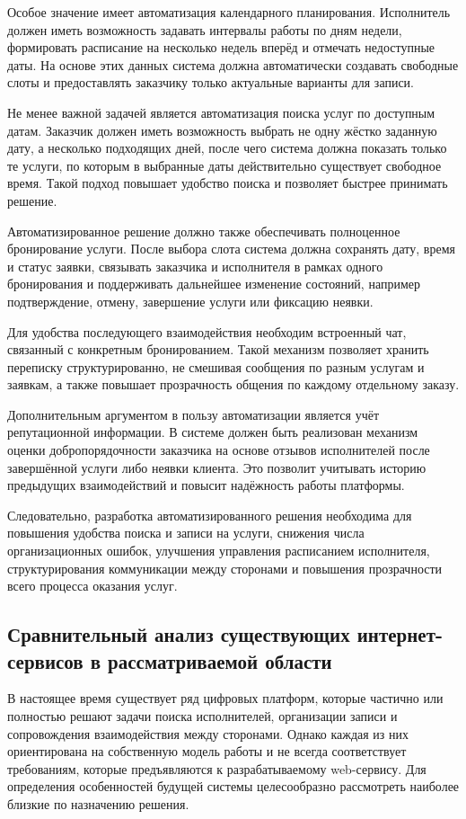 Особое значение имеет автоматизация календарного планирования. Исполнитель должен иметь возможность задавать интервалы работы по дням недели, формировать расписание на несколько недель вперёд и отмечать недоступные даты. На основе этих данных система должна автоматически создавать свободные слоты и предоставлять заказчику только актуальные варианты для записи.

Не менее важной задачей является автоматизация поиска услуг по доступным датам. Заказчик должен иметь возможность выбрать не одну жёстко заданную дату, а несколько подходящих дней, после чего система должна показать только те услуги, по которым в выбранные даты действительно существует свободное время. Такой подход повышает удобство поиска и позволяет быстрее принимать решение.

Автоматизированное решение должно также обеспечивать полноценное бронирование услуги. После выбора слота система должна сохранять дату, время и статус заявки, связывать заказчика и исполнителя в рамках одного бронирования и поддерживать дальнейшее изменение состояний, например подтверждение, отмену, завершение услуги или фиксацию неявки.

Для удобства последующего взаимодействия необходим встроенный чат, связанный с конкретным бронированием. Такой механизм позволяет хранить переписку структурированно, не смешивая сообщения по разным услугам и заявкам, а также повышает прозрачность общения по каждому отдельному заказу.

Дополнительным аргументом в пользу автоматизации является учёт репутационной информации. В системе должен быть реализован механизм оценки добропорядочности заказчика на основе отзывов исполнителей после завершённой услуги либо неявки клиента. Это позволит учитывать историю предыдущих взаимодействий и повысит надёжность работы платформы.

Следовательно, разработка автоматизированного решения необходима для повышения удобства поиска и записи на услуги, снижения числа организационных ошибок, улучшения управления расписанием исполнителя, структурирования коммуникации между сторонами и повышения прозрачности всего процесса оказания услуг.

\subsection{Сравнительный анализ существующих интернет-сервисов в рассматриваемой области}

В настоящее время существует ряд цифровых платформ, которые частично или полностью решают задачи поиска исполнителей, организации записи и сопровождения взаимодействия между сторонами. Однако каждая из них ориентирована на собственную модель работы и не всегда соответствует требованиям, которые предъявляются к разрабатываемому web-сервису. Для определения особенностей будущей системы целесообразно рассмотреть наиболее близкие по назначению решения.

